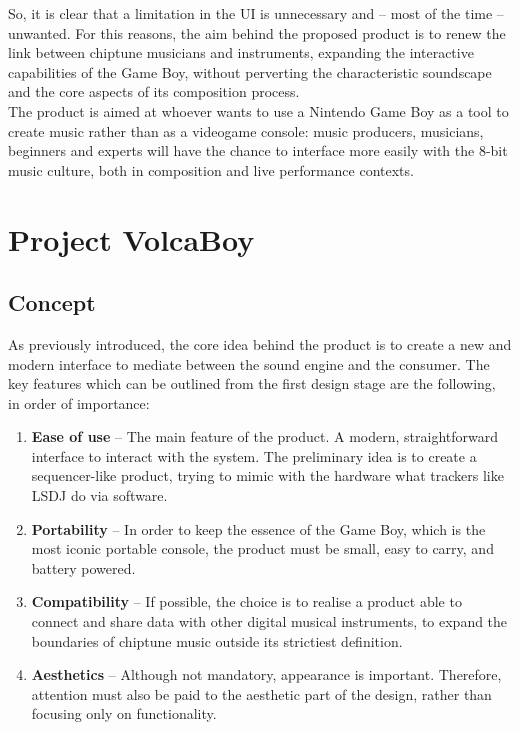 \documentclass[]{article}
\begin{document}
            So, it is clear that a limitation in the UI is unnecessary and -- most of the time -- unwanted. For this reasons, the aim 
            behind the proposed product is to renew the link between chiptune musicians and instruments, expanding the interactive capabilities of the Game Boy, 
            without perverting the characteristic soundscape and the core aspects of its composition process.\\
            The product is aimed at whoever wants to use a Nintendo Game Boy as a tool to create music rather than as a videogame console: music producers,
            musicians, beginners and experts will have the chance to interface more easily with the 8-bit music culture, both in 
            composition and live performance contexts.

\section{Project VolcaBoy}
    \subsection{Concept}\label{concept}
            As previously introduced, the core idea behind the product is to create a new and modern interface to mediate between the 
            sound engine and the consumer. The key features which can be outlined from the first design stage are the following, in order of importance:

            \begin{enumerate}
                \item \textbf{Ease of use} -- The main feature of the product. A modern, straightforward interface to interact with the system. The preliminary
                        idea is to create a sequencer-like product, trying to mimic with the hardware what trackers like LSDJ do via software.
                \item \textbf{Portability} -- In order to keep the essence of the Game Boy, which is the most iconic portable console, the product must be small, 
                        easy to carry, and battery powered.
                \item \textbf{Compatibility} -- If possible, the choice is to realise a product able to connect and share data with other digital musical instruments, 
                        to expand the boundaries of chiptune music outside its strictiest definition.
                \item \textbf{Aesthetics} -- Although not mandatory, appearance is important. Therefore, attention must also be paid 
                        to the aesthetic part of the design, rather than focusing only on functionality.
            \end{enumerate}
            
\end{document}
